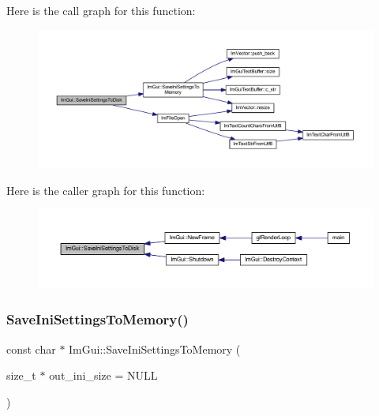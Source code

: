 Here is the call graph for this function\+:
\nopagebreak
\begin{figure}[H]
\begin{center}
\leavevmode
\includegraphics[width=350pt]{namespace_im_gui_afa4985e7810be4e687bc4ff28cec8a4d_cgraph}
\end{center}
\end{figure}
Here is the caller graph for this function\+:
\nopagebreak
\begin{figure}[H]
\begin{center}
\leavevmode
\includegraphics[width=350pt]{namespace_im_gui_afa4985e7810be4e687bc4ff28cec8a4d_icgraph}
\end{center}
\end{figure}
\mbox{\label{namespace_im_gui_a27043a530e0e842e01c279dd4207f9eb}} 
\subsubsection{\texorpdfstring{Save\+Ini\+Settings\+To\+Memory()}{SaveIniSettingsToMemory()}}
{\footnotesize\ttfamily const char $\ast$ Im\+Gui\+::\+Save\+Ini\+Settings\+To\+Memory (\begin{DoxyParamCaption}\item[{size\+\_\+t $\ast$}]{out\+\_\+ini\+\_\+size = {\ttfamily NULL} }\end{DoxyParamCaption})}

